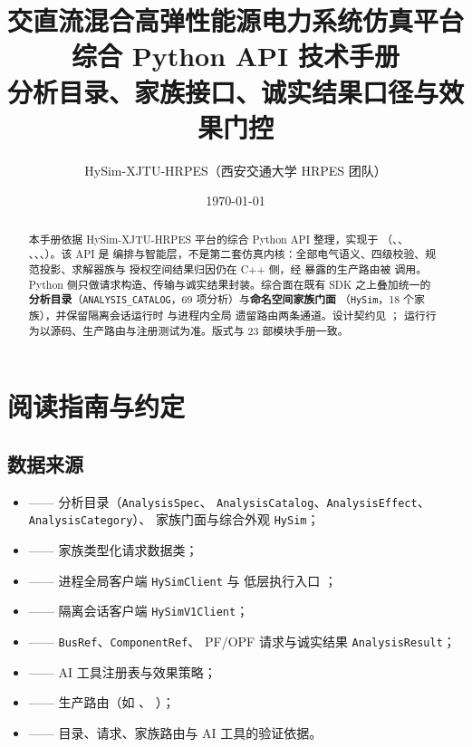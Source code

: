 \documentclass[UTF8,fontset=fandol,a4paper,11pt]{ctexart}
\title{\textbf{交直流混合高弹性能源电力系统仿真平台}\\[0.5em]
       {\Large 综合 Python API 技术手册}\\[0.3em]
       {\large 分析目录、家族接口、诚实结果口径与效果门控}}
\author{HySim-XJTU-HRPES（西安交通大学 HRPES 团队）}
\date{\today}
\begin{document}
\maketitle
\begin{abstract}
\noindent 本手册依据 HySim-XJTU-HRPES 平台的综合 Python API 整理，实现于
（、、
、、、）。该 API 是
编排与智能层，不是第二套仿真内核：全部电气语义、四级校验、规范投影、求解器族与
授权空间结果归因仍在 C++ 侧，经  暴露的生产路由被
调用。Python 侧只做请求构造、传输与诚实结果封装。综合面在既有 SDK 之上叠加统一的
\textbf{分析目录}（\texttt{ANALYSIS\_CATALOG}，69 项分析）与\textbf{命名空间家族门面}
（\texttt{HySim}，18 个家族），并保留隔离会话运行时  与进程内全局
遗留路由两条通道。设计契约见 ；
运行行为以源码、生产路由与注册测试为准。版式与 23 部模块手册一致。
\end{abstract}

\tableofcontents
\newpage

\section{阅读指南与约定}
\subsection{数据来源}
\begin{itemize}
  \item {} —— 分析目录（\texttt{AnalysisSpec}、
        \texttt{AnalysisCatalog}、\texttt{AnalysisEffect}、\texttt{AnalysisCategory}）、
        家族门面与综合外观 \texttt{HySim}；
  \item {} —— 家族类型化请求数据类；
  \item {} —— 进程全局客户端 \texttt{HySimClient} 与
        低层执行入口 ；
  \item {} —— 隔离会话客户端 \texttt{HySimV1Client}；
  \item {} —— \texttt{BusRef}、\texttt{ComponentRef}、
        PF/OPF 请求与诚实结果 \texttt{AnalysisResult}；
  \item {} —— AI 工具注册表与效果策略；
  \item {} —— 生产路由（如 、
        ）；
  \item {} —— 目录、请求、家族路由与 AI 工具的验证依据。
\end{itemize}
\end{document}
